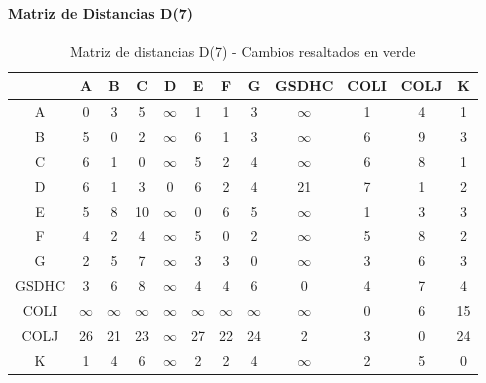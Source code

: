 \documentclass[12pt]{article}
\begin{document}
\paragraph{Matriz de Distancias D(7)}
\begin{table}[h!]
\centering
\begin{tabular}{|c|c|c|c|c|c|c|c|c|c|c|c|}
\hline
 & A & B & C & D & E & F & G & GSDHC & COLI & COLJ & K \\\hline
A & 0 & 3 & 5 & $\infty$ & 1 & 1 & 3 & $\infty$ & 1 & 4 & 1 \\\hline
B & \cellcolor{lightgreen} 5 & 0 & 2 & $\infty$ & \cellcolor{lightgreen} 6 & 1 & 3 & $\infty$ & \cellcolor{lightgreen} 6 & \cellcolor{lightgreen} 9 & 3 \\\hline
C & \cellcolor{lightgreen} 6 & 1 & 0 & $\infty$ & 5 & 2 & 4 & $\infty$ & 6 & 8 & 1 \\\hline
D & \cellcolor{lightgreen} 6 & 1 & 3 & 0 & 6 & 2 & 4 & 21 & 7 & 1 & 2 \\\hline
E & 5 & 8 & 10 & $\infty$ & 0 & 6 & 5 & $\infty$ & 1 & 3 & 3 \\\hline
F & \cellcolor{lightgreen} 4 & 2 & 4 & $\infty$ & \cellcolor{lightgreen} 5 & 0 & 2 & $\infty$ & \cellcolor{lightgreen} 5 & \cellcolor{lightgreen} 8 & 2 \\\hline
G & 2 & 5 & 7 & $\infty$ & 3 & 3 & 0 & $\infty$ & 3 & 6 & 3 \\\hline
GSDHC & 3 & 6 & 8 & $\infty$ & 4 & 4 & 6 & 0 & 4 & 7 & 4 \\\hline
COLI & $\infty$ & $\infty$ & $\infty$ & $\infty$ & $\infty$ & $\infty$ & $\infty$ & $\infty$ & 0 & 6 & 15 \\\hline
COLJ & \cellcolor{lightgreen} 26 & 21 & 23 & $\infty$ & \cellcolor{lightgreen} 27 & 22 & 24 & 2 & 3 & 0 & 24 \\\hline
K & 1 & 4 & 6 & $\infty$ & 2 & 2 & 4 & $\infty$ & 2 & 5 & 0 \\\hline
\end{tabular}
\caption{Matriz de distancias D(7) - Cambios resaltados en verde}
\end{table}
\end{document}
